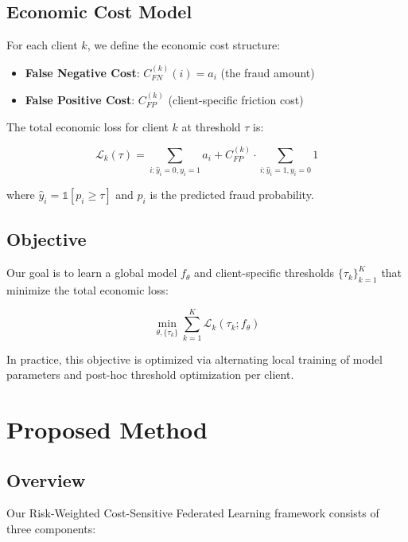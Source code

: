 \documentclass[conference]{IEEEtran}
\begin{document}
\subsection{Economic Cost Model}

For each client $k$, we define the economic cost structure:

\begin{itemize}
    \item \textbf{False Negative Cost}: $C_{FN}^{(k)}(i) = a_i$ (the fraud amount)
    \item \textbf{False Positive Cost}: $C_{FP}^{(k)}$ (client-specific friction cost)
\end{itemize}

The total economic loss for client $k$ at threshold $\tau$ is:

\begin{equation}
    \mathcal{L}_k(\tau) = \sum_{i: \hat{y}_i=0, y_i=1} a_i + C_{FP}^{(k)} \cdot \sum_{i: \hat{y}_i=1, y_i=0} 1
    \label{eq:economic_loss}
\end{equation}

where $\hat{y}_i = \mathbb{1}[p_i \geq \tau]$ and $p_i$ is the predicted fraud probability.

\subsection{Objective}

Our goal is to learn a global model $f_\theta$ and client-specific thresholds $\{\tau_k\}_{k=1}^K$ that minimize the total economic loss:

\begin{equation}
    \min_{\theta, \{\tau_k\}} \sum_{k=1}^{K} \mathcal{L}_k(\tau_k; f_\theta)
    \label{eq:objective}
\end{equation}

In practice, this objective is optimized via alternating local training of model parameters and post-hoc threshold optimization per client.

\section{Proposed Method}
\label{sec:method}

\subsection{Overview}

Our Risk-Weighted Cost-Sensitive Federated Learning framework consists of three components:
\end{document}
